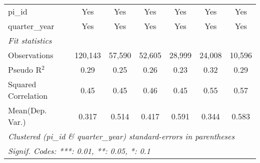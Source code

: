 \begin{tabular}{lcccccc}
   pi\_id                                                     & Yes           & Yes           & Yes            & Yes           & Yes           & Yes\\  
   quarter\_year                                              & Yes           & Yes           & Yes            & Yes           & Yes           & Yes\\  
   \midrule
   \emph{Fit statistics}\\
   Observations                                               & 120,143       & 57,590        & 52,605         & 28,999        & 24,008        & 10,596\\  
   Pseudo R$^2$                                               & 0.29          & 0.25          & 0.26           & 0.23          & 0.32          & 0.29\\  
   Squared Correlation                                        & 0.45          & 0.45          & 0.46           & 0.45          & 0.55          & 0.57\\  
Mean(Dep. Var.) & 0.317 & 0.514 & 0.417 & 0.591 & 0.344 & 0.583 \\
   \midrule \midrule
   \multicolumn{7}{l}{\emph{Clustered (pi\_id \& quarter\_year) standard-errors in parentheses}}\\
   \multicolumn{7}{l}{\emph{Signif. Codes: ***: 0.01, **: 0.05, *: 0.1}}\\
\end{tabular}
\par\endgroup
